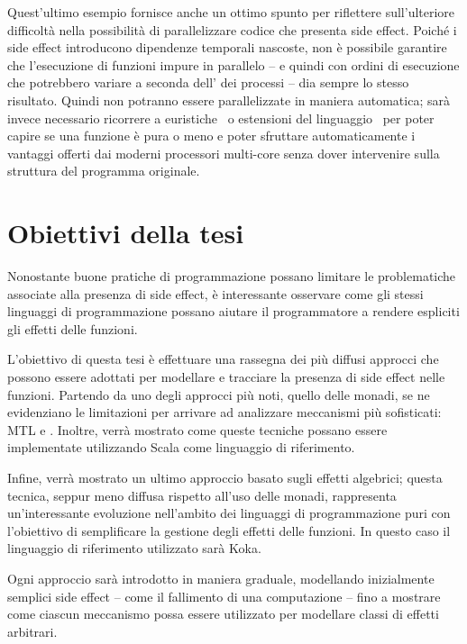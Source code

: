 


Quest'ultimo esempio fornisce anche un ottimo spunto per riflettere sull'ulteriore difficoltà nella possibilità di parallelizzare codice che presenta side effect.
Poiché i side effect introducono dipendenze temporali nascoste, non è possibile garantire che l'esecuzione di funzioni impure in parallelo -- e quindi con ordini di esecuzione che potrebbero variare a seconda dell' dei processi -- dia sempre lo stesso risultato.
Quindi non potranno essere parallelizzate in maniera automatica; sarà invece necessario ricorrere a euristiche~\cite{cit:safe-automated-refactoring-for-intelligent-parallelization-of-java-8-streams} o estensioni del linguaggio~\cite{cit:pure-functions-in-c-a-small-keyword-for-automatic-parallelization} per poter capire se una funzione è pura o meno e poter sfruttare automaticamente i vantaggi offerti dai moderni processori multi-core senza dover intervenire sulla struttura del programma originale.

\section*{Obiettivi della tesi}
Nonostante buone pratiche di programmazione possano limitare le problematiche associate alla presenza di side effect, è interessante osservare come gli stessi linguaggi di programmazione possano aiutare il programmatore a rendere espliciti gli effetti delle funzioni.

L'obiettivo di questa tesi è effettuare una rassegna dei più diffusi approcci che possono essere adottati per modellare e tracciare la presenza di side effect nelle funzioni.
Partendo da uno degli approcci più noti, quello delle monadi, se ne evidenziano le limitazioni per arrivare ad analizzare meccanismi più sofisticati: MTL e .
Inoltre, verrà mostrato come queste tecniche possano essere implementate utilizzando Scala come linguaggio di riferimento.

Infine, verrà mostrato un ultimo approccio basato sugli effetti algebrici; questa tecnica, seppur meno diffusa rispetto all'uso delle monadi, rappresenta un'interessante evoluzione nell'ambito dei linguaggi di programmazione puri con l'obiettivo di semplificare la gestione degli effetti delle funzioni.
In questo caso il linguaggio di riferimento utilizzato sarà Koka.

Ogni approccio sarà introdotto in maniera graduale, modellando inizialmente semplici side effect -- come il fallimento di una computazione -- fino a mostrare come ciascun meccanismo possa essere utilizzato per modellare classi di effetti arbitrari.
